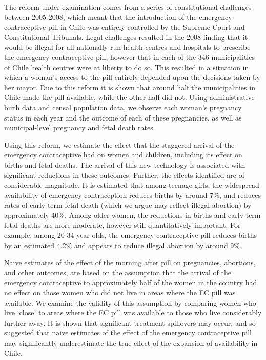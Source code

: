 The reform under examination comes from a series of constitutional challenges 
between 2005-2008, which meant that the introduction of the emergency contraceptive 
pill in Chile was entirely controlled by the Supreme Court and Constitutional 
Tribunals.  Legal challenges resulted in the 2008 finding that it would be illegal 
for all nationally run health centres and hospitals to prescribe the emergency 
contraceptive pill, however that in each of the 346 municipalities of Chile health 
centres were at liberty to do so.  This resulted  in a situation in which a woman's 
access to the pill entirely depended upon the decisions taken by her mayor.  Due 
to this reform it is shown that around half the municipalities in Chile made the 
pill available, while the other half did not.  Using administrative birth data and 
censal population data, we observe each woman's pregnancy status in each year and 
the outcome of each of these pregnancies, as well as municipal-level pregnancy and 
fetal death rates.

Using this reform, we estimate the effect that the staggered arrival of the 
emergency contraceptive had on women and children, including its effect on births 
and fetal deaths. The arrival of this new technology is associated with significant 
reductions in these outcomes.  Further, the effects identified are of considerable
magnitude.  It is estimated that among teenage girls, the widespread availability 
of emergency contraception reduces births by around 7\%, and reduces rates of early
term fetal death (which we argue may reflect illegal abortion) by approximately 40\%. 
Among older women, the reductions in births and early term fetal deaths are more 
moderate, however still quantitatively important.  For example, among 20-34 year 
olds, the emergency contraceptive pill reduces births by an estimated 4.2\% and 
appears to reduce illegal abortion by around 9\%.

\nocite{Goldin2006, Bailey2011}
\nocite{KearnerLevine2009}
\nocite{Ananatetal2007,ThomasDouglas1996,Levineetal1996}

Naive estimates of the effect of the morning after pill on pregnancies, abortions, 
and other outcomes, are based on the assumption that the arrival of the emergency 
contraceptive to approximately half of the women in the country had no effect on 
those women who did not live in areas where the EC pill was available.  We examine 
the validity of this assumption by comparing women who live `close' to areas where 
the EC pill was available to those who live considerably further away.  It is shown 
that significant treatment spillovers may occur, and so suggested that naive 
estimates of the effect of the emergency contraceptive pill may significantly 
underestimate the true effect of the expansion of availability in Chile.

